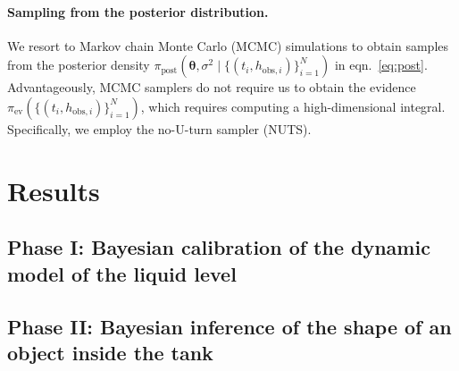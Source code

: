 \documentclass[openacc]{rsproca_new}%
\newcommand\thedatanomath {\{(t_i,h_{\text{obs}, i})\}_{i=1}^{N}}
\begin{document}
\paragraph{Sampling from the posterior distribution.} We resort to Markov chain Monte Carlo (MCMC) simulations to obtain samples from the posterior density $\pi_{\text{post}}(\boldsymbol \theta, \sigma^2 \mid \thedatanomath)$ in eqn.~\ref{eq:post}. Advantageously, MCMC samplers do not require us to obtain the evidence $\pi_{\text{ev}}(\thedatanomath)$, which requires computing a high-dimensional integral. Specifically, we employ the no-U-turn sampler (NUTS).



\section{Results}
\subsection{Phase I: Bayesian calibration of the dynamic model of the liquid level}

\subsection{Phase II: Bayesian inference of the shape of an object inside the tank}
\end{document}

